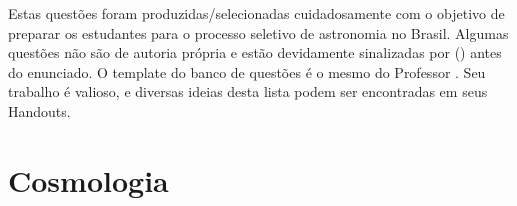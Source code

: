 \documentclass[11pt]{article}
\begin{document}

Estas questões foram produzidas/selecionadas cuidadosamente com o objetivo de preparar os estudantes para o processo seletivo de astronomia no Brasil. Algumas questões não são de autoria própria e estão devidamente sinalizadas por () antes do enunciado. O template do banco de questões é o mesmo do Professor . Seu trabalho é valioso, e diversas ideias desta lista podem ser encontradas em seus Handouts.




\section{Cosmologia}
\end{document}
